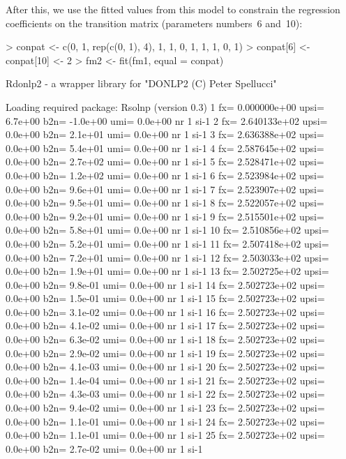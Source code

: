 \documentclass[article]{jss}
\begin{document}
After this, we use the fitted values from this model to constrain the
regression coefficients on the transition matrix (parameters numbers~6
and~10):
\begin{Schunk}
\begin{Sinput}
> conpat <- c(0, 1, rep(c(0, 1), 4), 1, 1, 0, 1, 1, 1, 0, 1)
> conpat[6] <- conpat[10] <- 2
> fm2 <- fit(fm1, equal = conpat)
\end{Sinput}
\begin{Soutput}
Rdonlp2 - a wrapper library for "DONLP2 (C) Peter Spellucci"


Loading required package: Rsolnp (version 0.3)
    1 fx=   0.000000e+00 upsi=  6.7e+00 b2n= -1.0e+00 umi=  0.0e+00 nr   1 si-1
    2 fx=   2.640133e+02 upsi=  0.0e+00 b2n=  2.1e+01 umi=  0.0e+00 nr   1 si-1
    3 fx=   2.636388e+02 upsi=  0.0e+00 b2n=  5.4e+01 umi=  0.0e+00 nr   1 si-1
    4 fx=   2.587645e+02 upsi=  0.0e+00 b2n=  2.7e+02 umi=  0.0e+00 nr   1 si-1
    5 fx=   2.528471e+02 upsi=  0.0e+00 b2n=  1.2e+02 umi=  0.0e+00 nr   1 si-1
    6 fx=   2.523984e+02 upsi=  0.0e+00 b2n=  9.6e+01 umi=  0.0e+00 nr   1 si-1
    7 fx=   2.523907e+02 upsi=  0.0e+00 b2n=  9.5e+01 umi=  0.0e+00 nr   1 si-1
    8 fx=   2.522057e+02 upsi=  0.0e+00 b2n=  9.2e+01 umi=  0.0e+00 nr   1 si-1
    9 fx=   2.515501e+02 upsi=  0.0e+00 b2n=  5.8e+01 umi=  0.0e+00 nr   1 si-1
   10 fx=   2.510856e+02 upsi=  0.0e+00 b2n=  5.2e+01 umi=  0.0e+00 nr   1 si-1
   11 fx=   2.507418e+02 upsi=  0.0e+00 b2n=  7.2e+01 umi=  0.0e+00 nr   1 si-1
   12 fx=   2.503033e+02 upsi=  0.0e+00 b2n=  1.9e+01 umi=  0.0e+00 nr   1 si-1
   13 fx=   2.502725e+02 upsi=  0.0e+00 b2n=  9.8e-01 umi=  0.0e+00 nr   1 si-1
   14 fx=   2.502723e+02 upsi=  0.0e+00 b2n=  1.5e-01 umi=  0.0e+00 nr   1 si-1
   15 fx=   2.502723e+02 upsi=  0.0e+00 b2n=  3.1e-02 umi=  0.0e+00 nr   1 si-1
   16 fx=   2.502723e+02 upsi=  0.0e+00 b2n=  4.1e-02 umi=  0.0e+00 nr   1 si-1
   17 fx=   2.502723e+02 upsi=  0.0e+00 b2n=  6.3e-02 umi=  0.0e+00 nr   1 si-1
   18 fx=   2.502723e+02 upsi=  0.0e+00 b2n=  2.9e-02 umi=  0.0e+00 nr   1 si-1
   19 fx=   2.502723e+02 upsi=  0.0e+00 b2n=  4.1e-03 umi=  0.0e+00 nr   1 si-1
   20 fx=   2.502723e+02 upsi=  0.0e+00 b2n=  1.4e-04 umi=  0.0e+00 nr   1 si-1
   21 fx=   2.502723e+02 upsi=  0.0e+00 b2n=  4.3e-03 umi=  0.0e+00 nr   1 si-1
   22 fx=   2.502723e+02 upsi=  0.0e+00 b2n=  9.4e-02 umi=  0.0e+00 nr   1 si-1
   23 fx=   2.502723e+02 upsi=  0.0e+00 b2n=  1.1e-01 umi=  0.0e+00 nr   1 si-1
   24 fx=   2.502723e+02 upsi=  0.0e+00 b2n=  1.1e-01 umi=  0.0e+00 nr   1 si-1
   25 fx=   2.502723e+02 upsi=  0.0e+00 b2n=  2.7e-02 umi=  0.0e+00 nr   1 si-1

\end{Soutput}
\end{Schunk}
\end{document}
